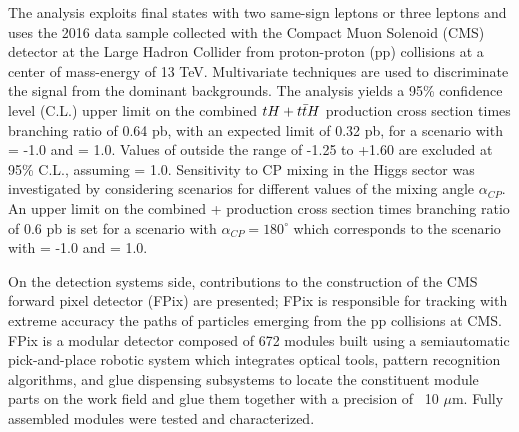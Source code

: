 The analysis exploits final states with two same-sign leptons or three leptons and uses the 2016 data sample collected with the Compact Muon Solenoid (CMS) detector at the Large Hadron Collider from proton-proton (pp) collisions at a center of mass-energy of 13 TeV. Multivariate techniques are used to discriminate the signal from the dominant backgrounds. The analysis yields a 95\% confidence level (C.L.) upper limit on the combined ${tH + t\bar{t}H}$ production cross section times branching ratio of 0.64 pb, with an expected limit of 0.32 pb, for a scenario with \Ct = -1.0 and \CV = 1.0. Values of \Ct outside the range of -1.25 to +1.60 are excluded at 95\% C.L., assuming \CV = 1.0. Sensitivity to CP mixing in the Higgs sector was investigated by considering scenarios for different values of the mixing angle $\alpha_{CP}$. An upper limit on the combined \tH + \ttH production cross section times branching ratio of 0.6 pb is set for a scenario with $\alpha_{CP}=180^\circ$ which corresponds to the scenario with \Ct = -1.0 and \CV = 1.0.

On the detection systems side, contributions to the construction of the CMS forward pixel detector (FPix) are presented; FPix is responsible for tracking with extreme accuracy the paths of particles emerging from the pp collisions at CMS. FPix is a modular detector composed of 672 modules built using a semiautomatic pick-and-place robotic system which integrates optical tools, pattern recognition algorithms, and glue dispensing subsystems to locate the constituent module parts on the work field and glue them together with a precision of ~10 $\mu$m. Fully assembled modules were tested and characterized.
